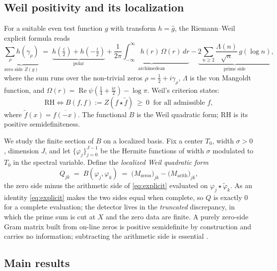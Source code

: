 \documentclass[11pt]{amsart}
\theoremstyle{definition}
\theoremstyle{remark}
\newcommand{\re}{\operatorname{Re}}
\begin{document}
\subsection{Weil positivity and its localization}

For a suitable even test function $g$ with transform $h=\hat g$, the
Riemann--Weil explicit formula reads
\begin{equation}\label{eq:explicit}
  \underbrace{\sum_{\rho} h(\gamma_\rho)}_{\text{zero side }Z(g)}
  \;=\;
  \underbrace{h(\tfrac i2)+h(-\tfrac i2)}_{\text{polar}}
  +\underbrace{\frac1{2\pi}\!\int_{-\infty}^{\infty}\! h(r)\,\Omega(r)\,dr}_{\text{archimedean}}
  -\underbrace{2\sum_{n\ge2}\frac{\Lambda(n)}{\sqrt n}\,g(\log n)}_{\text{prime side}},
\end{equation}
where the sum runs over the non-trivial zeros $\rho=\tfrac12+i\gamma_\rho$,
$\Lambda$ is the von Mangoldt function, and $\Omega(r)=\re\psi(\tfrac14+\tfrac{ir}{2})-\log\pi$.
Weil's criterion \cite{Weil1952,Bombieri2000} states:
\begin{equation}\label{eq:weil-criterion}
  \mathrm{RH}\iff B(f,f):=Z(f\star\tilde f)\ \ge\ 0\ \text{ for all admissible }f,
\end{equation}
where $\tilde f(x)=\overline{f(-x)}$. The functional $B$ is the Weil
quadratic form; RH is its positive semidefiniteness.

We study the finite section of $B$ on a localized basis. Fix a center $T_0$,
width $\sigma>0$, dimension $J$, and let $\{\varphi_j\}_{j=0}^{J-1}$ be the
Hermite functions of width $\sigma$ modulated to $T_0$ in the spectral
variable. Define the \emph{localized Weil quadratic form}
\begin{equation}\label{eq:Q}
  Q_{jk} \;=\; B(\varphi_j,\varphi_k)
  \;=\; \bigl(M_{\mathrm{zeros}}\bigr)_{jk}-\bigl(M_{\mathrm{arith}}\bigr)_{jk},
\end{equation}
the zero side minus the arithmetic side of \eqref{eq:explicit} evaluated on
$\varphi_j\star\tilde\varphi_k$. As an identity \eqref{eq:explicit} makes the
two sides equal when complete, so $Q$ is exactly $0$ for a complete
evaluation; the detector lives in the \emph{truncated} discrepancy, in which
the prime sum is cut at $X$ and the zero data are finite. A purely
zero-side Gram matrix built from on-line zeros is positive semidefinite by
construction and carries no information; subtracting the arithmetic side is
essential \cite{TrejoV7}.

\subsection{Main results}
\end{document}
